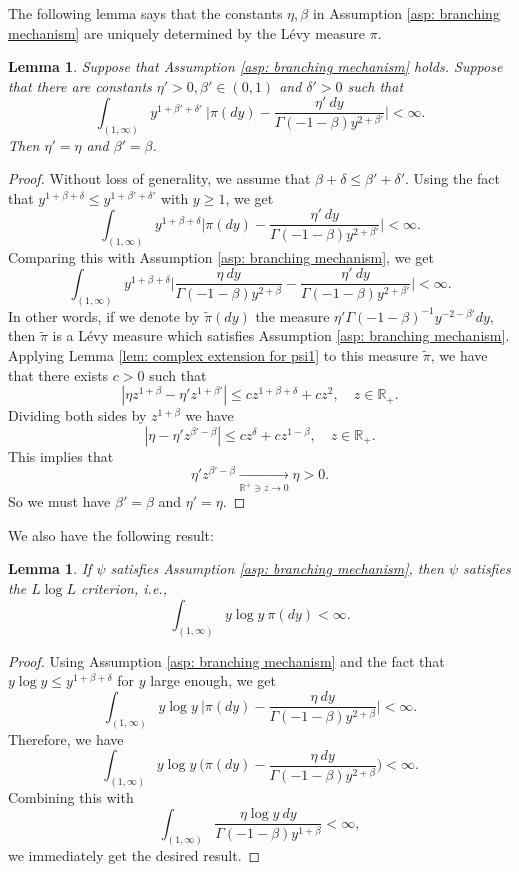 \documentclass[12pt,a4paper]{amsart}
\theoremstyle{plain}
\newtheorem{lem}[thm]{Lemma}
\theoremstyle{definition}
\numberwithin{equation}{section}
\begin{document}
The following lemma says that the constants $\eta, \beta$ in Assumption \ref{asp: branching mechanism} are uniquely determined by the L\'evy measure $\pi$.
\begin{lem}
\label{lem: unique of beta and eta}
Suppose that Assumption  \ref{asp: branching mechanism} holds.
	Suppose that there are constants $\eta'>0, \beta'\in (0,1)$ and $\delta' > 0$ such that
\[
	 \int_{(1,\infty)}y^{1+\beta' +\delta'}~\Big|\pi(dy)-\frac{\eta'~dy}{\Gamma(-1-\beta)y^{2+\beta'}}\Big| <\infty.
\]
	Then $\eta'= \eta$ and $\beta ' = \beta$.
\end{lem}
\begin{proof}
	Without loss of generality, we assume that $\beta+\delta \leq \beta'+ \delta'$.
	Using  the fact that $y^{1+\beta+ \delta} \leq y^{1+\beta'+\delta'}$ with $y \geq 1$, we get
\[
	\int_{(1,\infty)} y^{1+\beta + \delta} \Big|\pi(dy)-\frac{\eta'~dy}{\Gamma(-1-\beta)y^{2+\beta'}}\Big| <\infty.
\]
	Comparing this with Assumption \ref{asp: branching mechanism}, we get
\[
	\int_{(1,\infty)} y^{1+\beta + \delta} \Big|\frac{\eta~dy}{\Gamma(-1-\beta)y^{2+\beta}}-\frac{\eta'~dy}{\Gamma(-1-\beta)y^{2+\beta'}}\Big| <\infty.
\]
	In other words, if we denote by $\tilde \pi(dy)$ the measure $\eta' \Gamma(-1-\beta)^{-1} y^{-2-\beta'} dy$, then $\tilde \pi$ is a L\'evy measure which satisfies Assumption \ref{asp: branching mechanism}.
	Applying Lemma \ref{lem: complex extension for psi1} to this measure $\tilde \pi$, we have that there exists $c>0$ such that
\[
	|\eta z^{1+\beta} - \eta' z^{1+\beta'} |
	\leq cz^{1+\beta+ \delta}+cz^2,
	\quad z \in \mathbb R_+.
\]
Dividing both sides by $z^{1+\beta}$ we have
\[
	|\eta - \eta' z^{\beta' - \beta} |
	\leq cz^{\delta}+cz^{1-\beta},
	\quad z \in \mathbb R_+.
\]
	This implies that
\[
	\eta' z^{\beta' - \beta} \xrightarrow[\mathbb R^+\ni z\to 0]{} \eta >0.
\]
	So we must have $\beta'= \beta$ and $\eta'= \eta$.
\end{proof}

	We also have the following result:
\begin{lem}
\label{lem: LlogL criterion}
If $\psi$ satisfies Assumption  \ref{asp: branching mechanism}, then $\psi$ satisfies the $L \log L$ criterion, i.e.,
\[
    \int_{(1,\infty)} y \log y~\pi(dy)< \infty.
\]
\end{lem}
\begin{proof}
	Using  Assumption \ref{asp: branching mechanism} and the fact that $y\log y \leq y^{1+\beta+\delta}$ for $y$ large enough, we get
\[
	\int_{(1,\infty)}y\log y~\Big|\pi(dy)-\frac{\eta~dy}{\Gamma(-1-\beta)y^{2+\beta}}\Big| <\infty.
\]
	Therefore, we have
\[
	\int_{(1,\infty)}y\log y~\Big(\pi(dy)-\frac{\eta~dy}{\Gamma(-1-\beta)y^{2+\beta}}\Big) < \infty.
\]
Combining this with
\[
	\int_{(1,\infty)}\frac{\eta \log y~dy}{\Gamma(-1-\beta)y^{1+\beta}} < \infty,
\]
we immediately get the desired result.
\end{proof}
\end{document}
